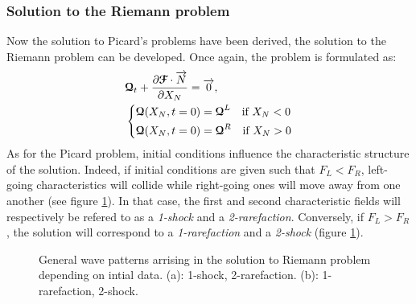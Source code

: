 \subsubsection*{Solution to the Riemann problem}
Now the solution to Picard's problems have been derived, the solution to the Riemann problem can be developed. Once again, the problem is formulated as:
\begin{equation}
  \begin{aligned}
    &{\boldsymbol{\mathcal{Q}}}_t + \frac{\partial {\boldsymbol{\mathcal{F}}}\cdot {\overrightarrow{N}}}{\partial X_N} = {\overrightarrow{0}}, \\
    &\left\lbrace 
      \begin{aligned}
        & {\boldsymbol{\mathcal{Q}}}(X_N,t=0) = {\boldsymbol{\mathcal{Q}}}^L \quad \text{if } X_N< 0\\
        & {\boldsymbol{\mathcal{Q}}}(X_N,t=0) = {\boldsymbol{\mathcal{Q}}}^R \quad \text{if } X_N> 0
      \end{aligned}
    \right.
  \end{aligned}
\end{equation}
As for the Picard problem, initial conditions influence the characteristic structure of the solution. Indeed, if initial conditions are given such that $F_L<F_R$, left-going characteristics will collide while right-going ones will move away from one another (see figure \ref{fig:RP_solution}). In that case, the first and second characteristic fields will respectively be refered to as a \textit{1-shock} and a \textit{2-rarefaction}. Conversely, if $F_L>F_R$, the solution will correspond to a \textit{1-rarefaction} and a \textit{2-shock} (figure \ref{fig:RP_solution}). 

\begin{figure}[h]
  \centering
  \caption{General wave patterns arrising in the solution to Riemann problem depending on intial data. (a): 1-shock, 2-rarefaction. (b): 1-rarefaction, 2-shock.}
  \label{fig:RP_solution}
\end{figure}

